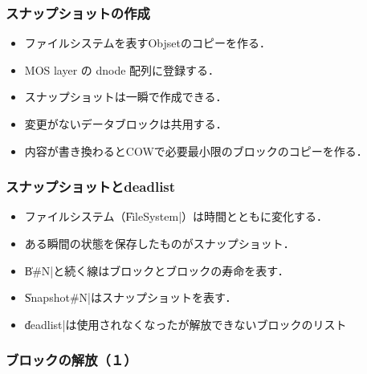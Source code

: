 \documentclass[unicode,handout]{beamer}                   %
\begin{document}
\begin{frame}[fragile]
  \frametitle{スナップショットの作成}
  \begin{itemize}
  \item ファイルシステムを表すObjsetのコピーを作る．
  \item MOS layer の dnode 配列に登録する．
  \item スナップショットは一瞬で作成できる．
  \item 変更がないデータブロックは共用する．
  \item 内容が書き換わるとCOWで必要最小限のブロックのコピーを作る．
  \end{itemize}
  \vfill
\end{frame}

\begin{frame}[fragile]
  \frametitle{スナップショットとdeadlist}
  \begin{itemize}
    \item ファイルシステム（\|FileSystem|）は時間とともに変化する．
    \item ある瞬間の状態を保存したものがスナップショット．
    \item \|B#N|と続く線はブロックとブロックの寿命を表す．
    \item \|Snapshot#N|はスナップショットを表す．
    \item \|deadlist|は使用されなくなったが解放できないブロックのリスト
  \end{itemize}
  \vfill
\end{frame}

\begin{frame}[fragile]
  \frametitle{ブロックの解放（１）}
  \vfill
\end{frame}
\end{document}
